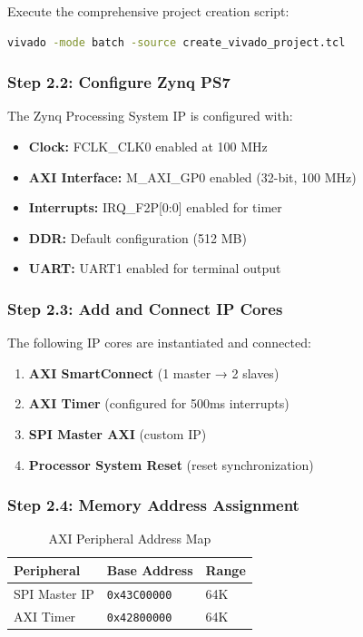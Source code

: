 \documentclass[11pt,a4paper]{article}
\begin{document}
Execute the comprehensive project creation script:

\begin{lstlisting}[language=bash, caption=Project Creation]
vivado -mode batch -source create_vivado_project.tcl
\end{lstlisting}

\subsubsection{Step 2.2: Configure Zynq PS7}

The Zynq Processing System IP is configured with:

\begin{itemize}
    \item \textbf{Clock:} FCLK\_CLK0 enabled at 100 MHz
    \item \textbf{AXI Interface:} M\_AXI\_GP0 enabled (32-bit, 100 MHz)
    \item \textbf{Interrupts:} IRQ\_F2P[0:0] enabled for timer
    \item \textbf{DDR:} Default configuration (512 MB)
    \item \textbf{UART:} UART1 enabled for terminal output
\end{itemize}

\subsubsection{Step 2.3: Add and Connect IP Cores}

The following IP cores are instantiated and connected:

\begin{enumerate}
    \item \textbf{AXI SmartConnect} (1 master → 2 slaves)
    \item \textbf{AXI Timer} (configured for 500ms interrupts)
    \item \textbf{SPI Master AXI} (custom IP)
    \item \textbf{Processor System Reset} (reset synchronization)
\end{enumerate}

\subsubsection{Step 2.4: Memory Address Assignment}

\begin{table}[H]
\centering
\caption{AXI Peripheral Address Map}
\begin{tabular}{@{}lll@{}}
\toprule
\textbf{Peripheral} & \textbf{Base Address} & \textbf{Range} \\ \midrule
SPI Master IP & \texttt{0x43C00000} & 64K \\
AXI Timer & \texttt{0x42800000} & 64K \\ \bottomrule
\end{tabular}
\end{table}
\end{document}
